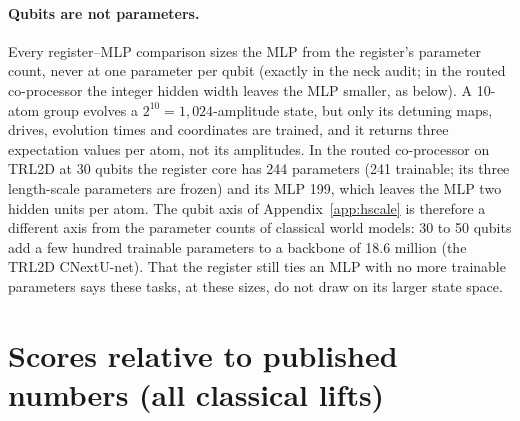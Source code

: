 \documentclass{article}
\begin{document}
\paragraph{Qubits are not parameters.} Every register--MLP comparison sizes the MLP from the register's parameter
count, never at one parameter per qubit (exactly in the neck audit; in the routed co-processor the integer hidden
width leaves the MLP smaller, as below). A 10-atom group evolves a $2^{10}=1{,}024$-amplitude state, but only its detuning maps, drives,
evolution times and coordinates are trained, and it returns three expectation values per atom, not its amplitudes. In the
routed co-processor on TRL2D at 30 qubits the register core has 244 parameters (241 trainable; its three length-scale
parameters are frozen) and its MLP 199, which
leaves the MLP two hidden units per atom. The qubit axis of Appendix~\ref{app:hscale} is therefore a different axis
from the parameter counts of classical world models: 30 to 50 qubits add a few hundred trainable parameters to a backbone
of 18.6 million (the TRL2D CNextU-net). That the register still ties an MLP with no more trainable parameters says these tasks, at these
sizes, do not draw on its larger state space.

\section{Scores relative to published numbers (all classical lifts)}
\label{app:sota}
\end{document}
